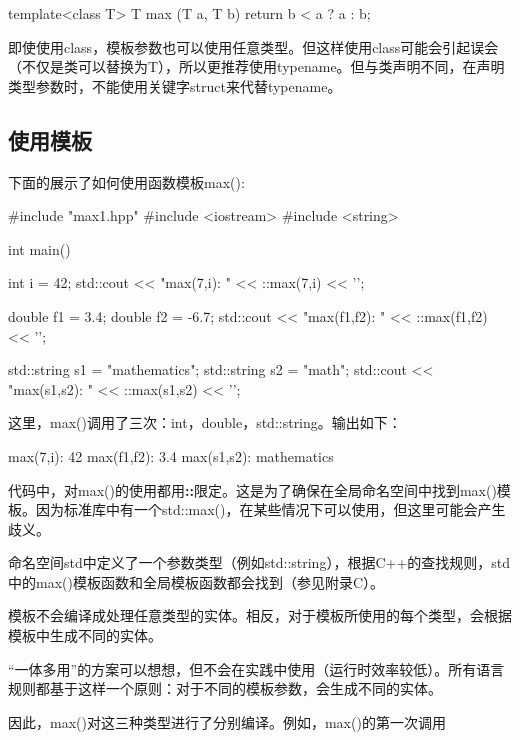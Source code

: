 \begin{cpp}
template<class T>
T max (T a, T b)
{
	return b < a ? a : b;
}
\end{cpp}

即使使用class，模板参数也可以使用任意类型。但这样使用class可能会引起误会（不仅是类可以替换为T），所以更推荐使用typename。但与类声明不同，在声明类型参数时，不能使用关键字struct来代替typename。

\subsection{使用模板}

下面的展示了如何使用函数模板max():

\begin{cpp}
#include "max1.hpp"
#include <iostream>
#include <string>

int main()
{
	int i = 42;
	std::cout << "max(7,i): " << ::max(7,i) << '\n';
	
	double f1 = 3.4;
	double f2 = -6.7;
	std::cout << "max(f1,f2): " << ::max(f1,f2) << '\n';
	
	std::string s1 = "mathematics";
	std::string s2 = "math";
	std::cout << "max(s1,s2): " << ::max(s1,s2) << '\n';
}
\end{cpp}

这里，max()调用了三次：int，double，std::string。输出如下：

\begin{shell}
max(7,i): 42
max(f1,f2): 3.4
max(s1,s2): mathematics
\end{shell}

代码中，对max()的使用都用\textbf{::}限定。这是为了确保在全局命名空间中找到max()模板。因为标准库中有一个std::max()，在某些情况下可以使用，但这里可能会产生歧义。

\begin{notice}
命名空间std中定义了一个参数类型（例如std::string），根据C++的查找规则，std中的max()模板函数和全局模板函数都会找到（参见附录C）。
\end{notice}

模板不会编译成处理任意类型的实体。相反，对于模板所使用的每个类型，会根据模板中生成不同的实体。

\begin{notice}
“一体多用”的方案可以想想，但不会在实践中使用（运行时效率较低）。所有语言规则都基于这样一个原则：对于不同的模板参数，会生成不同的实体。
\end{notice}

因此，max()对这三种类型进行了分别编译。例如，max()的第一次调用

